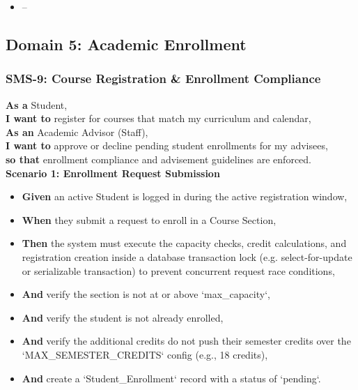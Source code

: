 \begin{itemize}
  \item --
\end{itemize}

\subsection{Domain 5: Academic Enrollment}

\subsubsection{SMS-9: Course Registration \& Enrollment Compliance}
\noindent \textbf{As a} Student, \\
\noindent \textbf{I want to} register for courses that match my curriculum and calendar, \\
\noindent \textbf{As an} Academic Advisor (Staff), \\
\noindent \textbf{I want to} approve or decline pending student enrollments for my advisees, \\
\noindent \textbf{so that} enrollment compliance and advisement guidelines are enforced. \\



\noindent\textbf{Scenario 1: Enrollment Request Submission}\\
\begin{itemize}
  \item \textbf{Given} an active Student is logged in during the active registration window,
  \item \textbf{When} they submit a request to enroll in a Course Section,
  \item \textbf{Then} the system must execute the capacity checks, credit calculations, and registration creation inside a database transaction lock (e.g. select-for-update or serializable transaction) to prevent concurrent request race conditions,
  \item \textbf{And} verify the section is not at or above `max\_capacity`,
  \item \textbf{And} verify the student is not already enrolled,
  \item \textbf{And} verify the additional credits do not push their semester credits over the `MAX\_SEMESTER\_CREDITS` config (e.g., 18 credits),
  \item \textbf{And} create a `Student\_Enrollment` record with a status of `pending`.
\end{itemize}


